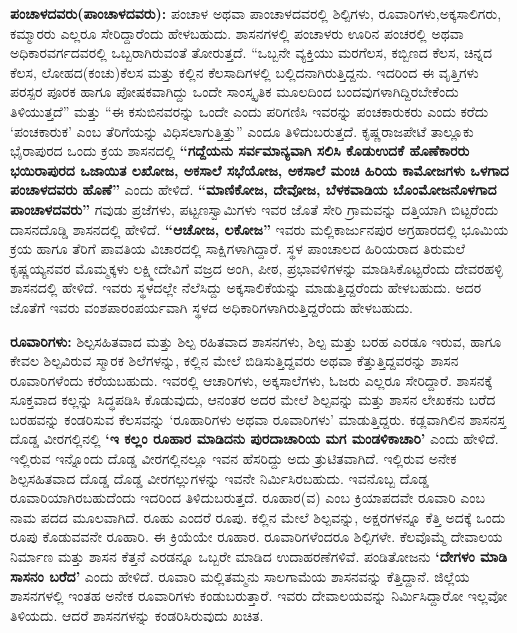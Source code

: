 \textbf{ಪಂಚಾಳದವರು(ಪಾಂಚಾಳದವರು):} ಪಂಚಾಳ ಅಥವಾ ಪಾಂಚಾಳದವರಲ್ಲಿ ಶಿಲ್ಪಿಗಳು, ರೂವಾರಿಗಳು,\break ಅಕ್ಕಸಾಲಿಗರು, ಕಮ್ಮಾರರು ಎಲ್ಲರೂ ಸೇರಿದ್ದಾರೆಂದು ಹೇಳಬಹುದು. ಶಾಸನಗಳಲ್ಲಿ ಪಂಚಾಳರು ಊರಿನ ಪಂಚರಲ್ಲಿ ಅಥವಾ ಅಧಿಕಾರವರ್ಗ\-ದವರಲ್ಲಿ ಒಬ್ಬರಾಗಿರುವಂತೆ ತೋರುತ್ತದೆ. “ಒಬ್ಬನೇ ವ್ಯಕ್ತಿಯು ಮರಗೆಲಸ, ಕಬ್ಬಿಣದ ಕೆಲಸ, ಚಿನ್ನದ ಕೆಲಸ, ಲೋಹದ(ಕಂಚು)ಕೆಲಸ ಮತ್ತು ಕಲ್ಲಿನ ಕೆಲಸಾದಿಗಳಲ್ಲಿ ಬಲ್ಲಿದನಾಗಿರುತ್ತಿದ್ದನು. ಇದರಿಂದ ಈ ವೃತ್ತಿಗಳು ಪರಸ್ಪರ ಪೂರಕ ಹಾಗೂ ಪೋಷಕವಾಗಿದ್ದು ಒಂದೇ ಸಾಂಸ್ಕೃತಿಕ ಮೂಲದಿಂದ ಬಂದವುಗಳಾಗಿದ್ದಿರಬೇಕೆಂದು ತಿಳಿಯುತ್ತದೆ” ಮತ್ತು “ಈ ಕಸುಬಿನವರನ್ನು ಒಂದೇ ಎಂದು ಪರಿಗಣಿಸಿ ಇವರನ್ನು ಪಂಚಕಾರುಕರು ಎಂದು ಕರೆದು ‘ಪಂಚಕಾರುಕ’ ಎಂಬ ತೆರಿಗೆಯನ್ನು ವಿಧಿಸಲಾಗುತ್ತಿತ್ತು” ಎಂದೂ ತಿಳಿದುಬರುತ್ತದೆ. ಕೃಷ್ಣರಾಜಪೇಟೆ ತಾಲ್ಲೂಕು ಭೈರಾಪುರದ ಒಂದು ಕ್ರಯ ಶಾಸನದಲ್ಲಿ \textbf{“ಗದ್ದೆಯನು ಸರ್ವಮಾನ್ಯವಾಗಿ ಸಲಿಸಿ ಕೊಡುಉದಕೆ ಹೊಣೆಕಾರರು ಭಯಿರಾಪುರದ ಒಜಾಯಿತ ಲಖೋಜ, ಅಕಸಾಲೆ ಸಭೆಯೋಜ, ಅಕಸಾಲೆ ಮಂಚಿ ಹಿರಿಯ ಕಾಮೋಜಗಳು ಒಳಗಾದ ಪಂಚಾಳದವರು ಹೊಣೆ”} ಎಂದು ಹೇಳಿದೆ.\break \textbf{ “ಮಾಣಿಕೋಜ, ದೇವೋಜ, ಬೆಳಕವಾಡಿಯ ಬೊಂಮೋಜನೊಳಗಾದ ಪಾಂಚಾಳದವರು”} ಗವುಡು ಪ್ರಜೆಗಳು, ಪಟ್ಟಣಸ್ವಾಮಿ\-ಗಳು ಇವರ ಜೊತೆ ಸೇರಿ ಗ್ರಾಮವನ್ನು ದತ್ತಿಯಾಗಿ ಬಿಟ್ಟರೆಂದು ದಾಸನದೊಡ್ಡಿ ಶಾಸನದಲ್ಲಿ ಹೇಳಿದೆ.\textbf{ “ಆಚೋಜ, ಲಕೋಜ”} ಇವರು ಮಲ್ಲಿಕಾರ್ಜುನಪುರ ಅಗ್ರಹಾರದಲ್ಲಿ ಭೂಮಿಯ ಕ್ರಯ ಹಾಗೂ ತೆರಿಗೆ ಪಾವತಿಯ ವಿಚಾರದಲ್ಲಿ ಸಾಕ್ಷಿಗಳಾಗಿದ್ದಾರೆ. ಸ್ಥಳ ಪಾಂಚಾಲದ ಹಿರಿಯರಾದ ತಿರುಮಲೆ ಕೃಷ್ಣಯ್ಯನವರ ಮೊಮ್ಮಕ್ಕಳು ಲಕ್ಷ್ಮೀದೇವಿಗೆ ವಜ್ರದ ಅಂಗಿ, ಪೀಠ, ಪ್ರಭಾವಳಿಗಳನ್ನು ಮಾಡಿಸಿಕೊಟ್ಟರೆಂದು ದೇವರಹಳ್ಳಿ ಶಾಸನದಲ್ಲಿ ಹೇಳಿದೆ. ಇವರು ಸ್ಥಳದಲ್ಲೇ ನೆಲೆಸಿದ್ದು ಅಕ್ಕಸಾಲಿಕೆಯನ್ನು ಮಾಡುತ್ತಿದ್ದರೆಂದು ಹೇಳಬಹುದು. ಅದರ ಜೊತೆಗೆ ಇವರು ವಂಶಪಾರಂಪರ್ಯವಾಗಿ ಸ್ಥಳದ ಅಧಿಕಾರಿಗಳಾಗಿರುತ್ತಿದ್ದರೆಂದು ಹೇಳಬಹುದು.

\textbf{ರೂವಾರಿಗಳು:} ಶಿಲ್ಪಸಹಿತವಾದ ಮತ್ತು ಶಿಲ್ಪ ರಹಿತವಾದ ಶಾಸನಗಳು, ಶಿಲ್ಪ ಮತ್ತು ಬರಹ ಎರಡೂ ಇರುವ, ಹಾಗೂ ಕೇವಲ ಶಿಲ್ಪವಿರುವ ಸ್ಮಾರಕ ಶಿಲೆಗಳನ್ನು, ಕಲ್ಲಿನ ಮೇಲೆ ಬಿಡಿಸುತ್ತಿದ್ದವರು ಅಥವಾ ಕೆತ್ತುತ್ತಿದ್ದವರನ್ನು ಶಾಸನ ರೂವಾರಿಗಳೆಂದು ಕರೆಯಬಹುದು. ಇವರಲ್ಲಿ ಆಚಾರಿಗಳು, ಅಕ್ಕಸಾಲೆಗಳು, ಓಜರು ಎಲ್ಲರೂ ಸೇರಿದ್ದಾರೆ. ಶಾಸನಕ್ಕೆ ಸೂಕ್ತವಾದ ಕಲ್ಲನ್ನು ಸಿದ್ಧಪಡಿಸಿ ಕೊಡುವುದು, ಆನಂತರ ಅದರ ಮೇಲೆ ಶಿಲ್ಪವನ್ನು ಮತ್ತು ಶಾಸನ ಲೇಖಕನು ಬರೆದ ಬರಹವನ್ನು ಕಂಡರಿಸುವ ಕೆಲಸವನ್ನು ‘ರೂಹಾರಿಗಳು ಅಥವಾ ರೂವಾರಿಗಳು’ ಮಾಡುತ್ತಿದ್ದರು. ಕಡ್ಲವಾಗಿಲಿನ ಶಾಸನಸ್ತ ದೊಡ್ಡ ವೀರಗಲ್ಲಿನಲ್ಲಿ \textbf{‘ಇ ಕಲ್ಲಂ ರೂಹಾರ ಮಾಡಿದನು ಪುರದಾಚಾರಿಯ ಮಗ ಮಂಡಳಿಕಾಚಾರಿ’} ಎಂದು ಹೇಳಿದೆ. ಇಲ್ಲಿರುವ ಇನ್ನೊಂದು ದೊಡ್ಡ ವೀರಗಲ್ಲಿನಲ್ಲೂ ಇವನ ಹೆಸರಿದ್ದು ಅದು ತ್ರುಟಿತವಾಗಿದೆ\textbf{}. ಇಲ್ಲಿರುವ ಅನೇಕ ಶಿಲ್ಪಸಹಿತವಾದ ದೊಡ್ಡ ದೊಡ್ಡ ವೀರಗಲ್ಲುಗಳನ್ನು ಇವನೇ ನಿರ್ಮಿಸಿರಬಹುದು. ಇವನೊಬ್ಬ ದೊಡ್ಡ ರೂವಾರಿಯಾಗಿರಬಹುದೆಂದು ಇದರಿಂದ ತಿಳಿದುಬರುತ್ತದೆ. ರೂಹಾರ(ವ) ಎಂಬ ಕ್ರಿಯಾಪದವೇ ರೂವಾರಿ ಎಂಬ ನಾಮ ಪದದ ಮೂಲವಾಗಿದೆ. ರೂಹು ಎಂದರೆ ರೂಪು. ಕಲ್ಲಿನ ಮೇಲೆ ಶಿಲ್ಪವನ್ನು, ಅಕ್ಷರಗಳನ್ನೂ ಕೆತ್ತಿ ಅದಕ್ಕೆ ಒಂದು ರೂಪು ಕೊಡುವವನೇ ರೂಹಾರಿ. ಈ ಕ್ರಿಯೆಯೇ ರೂಹಾರ. ರೂವಾರಿಗಳೆಂದರೂ ಶಿಲ್ಪಿಗಳೇ. ಕೆಲವೊಮ್ಮೆ ದೇವಾಲಯ ನಿರ್ಮಾಣ ಮತ್ತು ಶಾಸನ ಕೆತ್ತನೆ ಎರಡನ್ನೂ ಒಬ್ಬರೇ ಮಾಡಿದ ಉದಾಹರಣೆಗಳಿವೆ. ಪಂಡಿತೋಜನು \textbf{‘ದೇಗಳಂ ಮಾಡಿ ಸಾಸನಂ ಬರೆದ’} ಎಂದು ಹೇಳಿದೆ. ರೂವಾರಿ ಮಲ್ಲಿತಮ್ಮನು ಸಾಲಗಾಮೆಯ ಶಾಸನವನ್ನು ಕೆತ್ತಿದ್ದಾನೆ. ಜಿಲ್ಲೆಯ ಶಾಸನಗಳಲ್ಲಿ ಇಂತಹ ಅನೇಕ ರೂವಾರಿಗಳು ಕಂಡುಬರುತ್ತಾರೆ. ಇವರು ದೇವಾಲಯವನ್ನು ನಿರ್ಮಿಸಿದ್ದಾರೋ ಇಲ್ಲವೋ ತಿಳಿಯದು. ಆದರೆ ಶಾಸನಗಳನ್ನು ಕಂಡರಿಸಿರುವುದು ಖಚಿತ.

